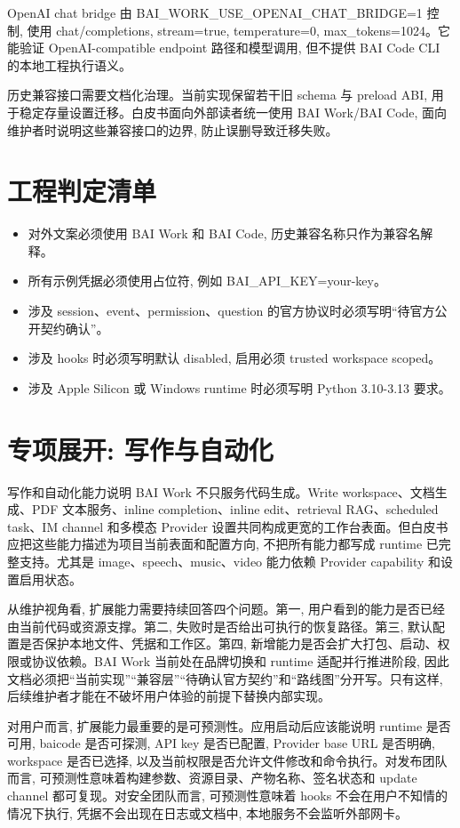 OpenAI chat bridge 由 BAI\_WORK\_USE\_OPENAI\_CHAT\_BRIDGE=1 控制, 使用 chat/completions, stream=true, temperature=0, max\_tokens=1024。它能验证 OpenAI-compatible endpoint 路径和模型调用, 但不提供 BAI Code CLI 的本地工程执行语义。

历史兼容接口需要文档化治理。当前实现保留若干旧 schema 与 preload ABI, 用于稳定存量设置迁移。白皮书面向外部读者统一使用 BAI Work/BAI Code, 面向维护者时说明这些兼容接口的边界, 防止误删导致迁移失败。

\section{工程判定清单}
\begin{itemize}
  \item 对外文案必须使用 BAI Work 和 BAI Code, 历史兼容名称只作为兼容名解释。
  \item 所有示例凭据必须使用占位符, 例如 BAI\_API\_KEY=your-key。
  \item 涉及 session、event、permission、question 的官方协议时必须写明“待官方公开契约确认”。
  \item 涉及 hooks 时必须写明默认 disabled, 启用必须 trusted workspace scoped。
  \item 涉及 Apple Silicon 或 Windows runtime 时必须写明 Python 3.10-3.13 要求。
\end{itemize}

\section{专项展开: 写作与自动化}
写作和自动化能力说明 BAI Work 不只服务代码生成。Write workspace、文档生成、PDF 文本服务、inline completion、inline edit、retrieval RAG、scheduled task、IM channel 和多模态 Provider 设置共同构成更宽的工作台表面。但白皮书应把这些能力描述为项目当前表面和配置方向, 不把所有能力都写成 runtime 已完整支持。尤其是 image、speech、music、video 能力依赖 Provider capability 和设置启用状态。

从维护视角看, 扩展能力需要持续回答四个问题。第一, 用户看到的能力是否已经由当前代码或资源支撑。第二, 失败时是否给出可执行的恢复路径。第三, 默认配置是否保护本地文件、凭据和工作区。第四, 新增能力是否会扩大打包、启动、权限或协议依赖。BAI Work 当前处在品牌切换和 runtime 适配并行推进阶段, 因此文档必须把“当前实现”“兼容层”“待确认官方契约”和“路线图”分开写。只有这样, 后续维护者才能在不破坏用户体验的前提下替换内部实现。

对用户而言, 扩展能力最重要的是可预测性。应用启动后应该能说明 runtime 是否可用, baicode 是否可探测, API key 是否已配置, Provider base URL 是否明确, workspace 是否已选择, 以及当前权限是否允许文件修改和命令执行。对发布团队而言, 可预测性意味着构建参数、资源目录、产物名称、签名状态和 update channel 都可复现。对安全团队而言, 可预测性意味着 hooks 不会在用户不知情的情况下执行, 凭据不会出现在日志或文档中, 本地服务不会监听外部网卡。

